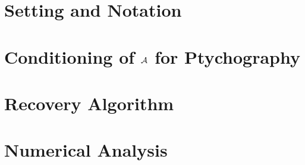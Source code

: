 \section{Setting and Notation}

\label{sec:ptych_intro}

\section{Conditioning of $\mathcal{A}$ for Ptychography}

\label{sec:con_number_ptych}

\section{Recovery Algorithm}

\label{sec:ptych_recov}
\label{sec:ptych_recovery}

\section{Numerical Analysis}

\label{sec:ptych_num}
